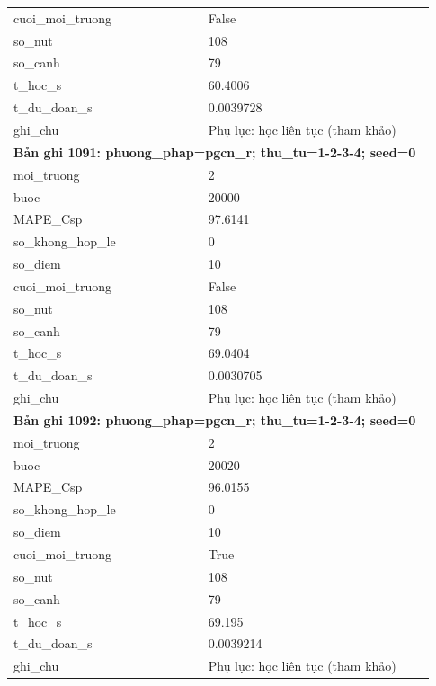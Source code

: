 \begin{longtable}{p{0.43\linewidth}p{0.50\linewidth}}
cuoi\_\allowbreak moi\_\allowbreak truong & False \\
so\_\allowbreak nut & 108 \\
so\_\allowbreak canh & 79 \\
t\_\allowbreak hoc\_\allowbreak s & 60.4006 \\
t\_\allowbreak du\_\allowbreak doan\_\allowbreak s & 0.0039728 \\
ghi\_\allowbreak chu & Phụ lục: học liên tục (tham khảo) \\
\midrule
\multicolumn{2}{p{0.95\linewidth}}{\textbf{Bản ghi 1091: phuong\_phap=pgcn\_r; thu\_tu=1-2-3-4; seed=0}} \\
moi\_\allowbreak truong & 2 \\
buoc & 20000 \\
MAPE\_\allowbreak Csp & 97.6141 \\
so\_\allowbreak khong\_\allowbreak hop\_\allowbreak le & 0 \\
so\_\allowbreak diem & 10 \\
cuoi\_\allowbreak moi\_\allowbreak truong & False \\
so\_\allowbreak nut & 108 \\
so\_\allowbreak canh & 79 \\
t\_\allowbreak hoc\_\allowbreak s & 69.0404 \\
t\_\allowbreak du\_\allowbreak doan\_\allowbreak s & 0.0030705 \\
ghi\_\allowbreak chu & Phụ lục: học liên tục (tham khảo) \\
\midrule
\multicolumn{2}{p{0.95\linewidth}}{\textbf{Bản ghi 1092: phuong\_phap=pgcn\_r; thu\_tu=1-2-3-4; seed=0}} \\
moi\_\allowbreak truong & 2 \\
buoc & 20020 \\
MAPE\_\allowbreak Csp & 96.0155 \\
so\_\allowbreak khong\_\allowbreak hop\_\allowbreak le & 0 \\
so\_\allowbreak diem & 10 \\
cuoi\_\allowbreak moi\_\allowbreak truong & True \\
so\_\allowbreak nut & 108 \\
so\_\allowbreak canh & 79 \\
t\_\allowbreak hoc\_\allowbreak s & 69.195 \\
t\_\allowbreak du\_\allowbreak doan\_\allowbreak s & 0.0039214 \\
ghi\_\allowbreak chu & Phụ lục: học liên tục (tham khảo) \\

\end{longtable}
